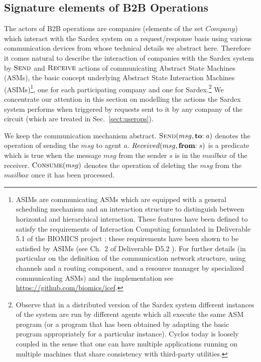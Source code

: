 \subsection{Signature elements of B2B Operations}
\label{signaturepaymtop}
The actors of B2B operations are companies (elements of the set $Company$) which interact with the Sardex system on a request/response basis using various communication devices from whose technical details we abstract here. Therefore it comes natural to describe the interaction of companies with the Sardex system by $\hbox{\sc Send}$ and $\hbox{\sc Receive}$ actions of communicating Abstract State Machines (ASMs), the basic concept underlying Abstract State Interaction Machines (ASIMs)\footnote{ASIMs are communicating ASMs which are equipped with a general scheduling mechanism and an interaction structure to distinguish between horizontal and hierarchical interaction. These features have been defined to satisfy the requirements of Interaction Computing formulated in Deliverable 5.1 of the BIOMICS project  \cite{BIOMICSD51}; these requirements have been shown to be satisfied by ASIMs (see Ch.\ 2 of Deliverable D5.2 \cite{BIOMICSD52}). For further details (in particular on the definition of the communication network structure, using channels and a routing component, and a resource manager by specialized communicating ASMs) and the implementation see \url{https://github.com/biomics/icef}.}, one for each participating company and one for Sardex.\footnote{Observe that in a distributed version of the Sardex system different instances of the system are run by different agents which all execute the same ASM program (or a program that has been obtained by adapting the basic program appropriately for a particular instance). Cyclos today is loosely coupled in the sense that one can have multiple applications running on multiple machines that share consistency with third-party utilities.} We concentrate our attention in this section on modelling the actions the Sardex system performs when triggered by requests sent to it by any company of the circuit (which are treated in Sec.~\ref{sect:userops}).

We keep the communication mechanism abstract. $\hbox{\sc Send}(msg,\mathrel{\mathbf{to}} :a)$ denotes the operation of sending the $msg$ to agent $a$. 
$Received(msg,\mathrel{\mathbf{from}} :s)$ is a predicate which is true when the message $msg$ from the sender $s$ is in the $mailbox$ of the receiver. $\hbox{\sc Consume}(msg)$ denotes the operation of deleting the $msg$ from the $mailbox$ once it has been processed. 

